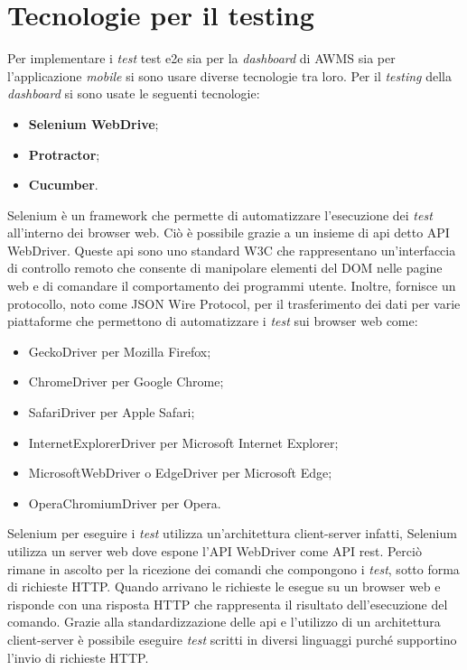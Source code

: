 \section{Tecnologie per il testing}
Per implementare i \emph{test} \gls{test e2e} sia per la \emph{dashboard} di \gls{AWMS} sia per l'applicazione \emph{mobile} si sono usare diverse tecnologie tra loro. Per il \emph{testing} della \emph{dashboard} si sono usate le seguenti tecnologie:
\begin{itemize}
	\item \textbf{Selenium WebDrive};
	\item \textbf{Protractor};
	\item \textbf{Cucumber}.
\end{itemize}
Selenium è un \gls{framework}\ap{[g]} che permette di automatizzare l'esecuzione dei \emph{test} all'interno dei \gls{browser web}\ap{[g]}. Ciò è possibile grazie a un insieme di \gls{api}\ap{[g]} detto API WebDriver. Queste \gls{api}\ap{[g]} sono uno standard W3C che rappresentano un'interfaccia di controllo remoto che consente di manipolare elementi del DOM nelle pagine web e di comandare il comportamento dei programmi utente. Inoltre, fornisce un protocollo, noto come JSON Wire Protocol, per il trasferimento dei dati per varie piattaforme che permettono di automatizzare i \emph{test} sui \gls{browser web}\ap{[g]} come:
\begin{itemize}
	\item GeckoDriver per Mozilla Firefox;
	\item ChromeDriver per Google Chrome;
	\item SafariDriver per Apple Safari;
	\item InternetExplorerDriver per Microsoft Internet Explorer;
	\item MicrosoftWebDriver o EdgeDriver per Microsoft Edge;
	\item OperaChromiumDriver per Opera.
\end{itemize}
Selenium per eseguire i \emph{test} utilizza un’architettura client-server infatti, Selenium utilizza un server web dove espone l'API WebDriver come API \gls{rest}\glsfirstoccur. Perciò rimane in ascolto per la ricezione dei comandi che compongono i \emph{test}, sotto forma di richieste HTTP. Quando arrivano le richieste le esegue su un \gls{browser web}\ap{[g]} e risponde con una risposta HTTP che rappresenta il risultato dell'esecuzione del comando. Grazie alla standardizzazione delle \gls{api}\ap{[g]} e l'utilizzo di un architettura client-server è possibile eseguire \emph{test} scritti in diversi linguaggi purché supportino l'invio di richieste HTTP.

